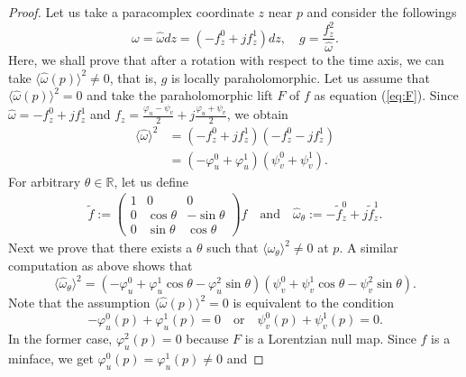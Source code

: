\documentclass[11pt,reqno]{amsart}
\theoremstyle{plain} %
\theoremstyle{definition}
\begin{document}
\begin{proof}
Let us take a paracomplex coordinate $z$ near $p$ and consider the followings
\begin{equation*}
\omega=\hat{\omega}dz=(-f^0_z+jf^1_z)dz, \quad g=\frac{f^2_z}{\hat{\omega}}.
\end{equation*}
Here, we shall prove that after a rotation with respect to the time axis, we can take $\langle \hat{\omega}(p)\rangle^2 \neq 0$, that is, $g$ is locally paraholomorphic. Let us assume that $\langle \hat{\omega}(p)\rangle^2=0$ and take the paraholomorphic lift $F$ of $f$ as equation (\ref{eq:F}). Since $\hat{\omega}=-f^0_z+jf^1_z$ and $f_z=\frac{\varphi_u-\psi_v}{2}+j\frac{\varphi_u+\psi_v}{2}$, we obtain
\begin{align*}
\langle \hat{\omega}\rangle^2&=(-f^0_z+jf^1_z)(-f^0_z-jf^1_z)\\
&=(-\varphi_u^0+\varphi_u^1)(\psi_v^0+\psi_v^1).
\end{align*}
For arbitrary $\theta\in \mathbb{R}$, let us define
\begin{align*}
\tilde{f}:= \left(
    \begin{array}{ccc}
      1 &0  & 0 \\
     0  & \cos \theta & -\sin \theta \\
      0 & \sin \theta & \cos \theta 
 \end{array}
  \right)f \quad \text{and}\quad \hat{\omega}_{\theta}:=-\tilde{f}^0_z+j\tilde{f}^1_z.
\end{align*}
Next we prove that there exists a $\theta$ such that $\langle \hat{\omega}_{\theta}\rangle^2 \neq 0$ at $p$. A similar computation as above shows that
\begin{equation*}
\langle \hat{\omega}_{\theta}\rangle^2=(-\varphi_u^0+\varphi_u^1\cos \theta-\varphi_u^2\sin \theta)(\psi_v^0+\psi_v^1\cos \theta-\psi_v^2\sin \theta).
\end{equation*}
Note that the assumption $\langle \hat{\omega}(p)\rangle^2=0$ is equivalent to the condition
\begin{equation*}
-\varphi_u^0(p)+\varphi_u^1(p)=0\quad \text{or}\quad \psi_v^0(p)+\psi_v^1(p)=0.
\end{equation*}
In the former case, $\varphi_u^2(p)=0$ because $F$ is a Lorentzian null map. Since $f$ is a minface, we get $\varphi_u^0(p)=\varphi_u^1(p)\neq0$ and


\end{proof}
\end{document}
